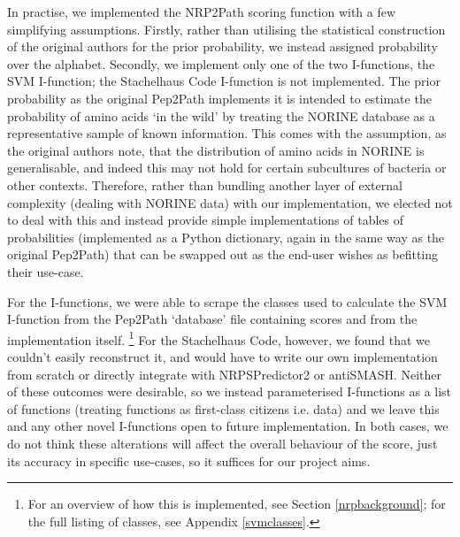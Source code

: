 \documentclass{l4proj}
\begin{document}
In practise, we implemented the NRP2Path scoring function with a few simplifying assumptions. Firstly, rather than utilising the statistical construction of the original authors for the prior probability, we instead assigned probability over the alphabet. Secondly, we implement only one of the two I-functions, the SVM I-function; the Stachelhaus Code I-function is not implemented. The prior probability as the original Pep2Path implements it is intended to estimate the probability of amino acids `in the wild' by treating the NORINE database as a representative sample of known information. This comes with the assumption, as the original authors note, that the distribution of amino acids in NORINE is generalisable, and indeed this may not hold for certain subcultures of bacteria or other contexts. Therefore, rather than bundling another layer of external complexity (dealing with NORINE data) with our implementation, we elected not to deal with this and instead provide simple implementations of tables of probabilities (implemented as a Python dictionary, again in the same way as the original Pep2Path) that can be swapped out as the end-user wishes as befitting their use-case.

For the I-functions, we were able to scrape the classes used to calculate the SVM I-function from the Pep2Path `database' file containing scores and from the implementation itself. \footnote{For an overview of how this is implemented, see Section \ref{nrpbackground}; for the full listing of classes, see Appendix \ref{svmclasses}.} For the Stachelhaus Code, however, we found that we couldn't easily reconstruct it, and would have to write our own implementation from scratch or directly integrate with NRPSPredictor2 or antiSMASH. Neither of these outcomes were desirable, so we instead parameterised I-functions as a list of functions (treating functions as first-class citizens i.e. data) and we leave this and any other novel I-functions open to future implementation. In both cases, we do not think these alterations will affect the overall behaviour of the score, just its accuracy in specific use-cases, so it suffices for our project aims.
\end{document}
